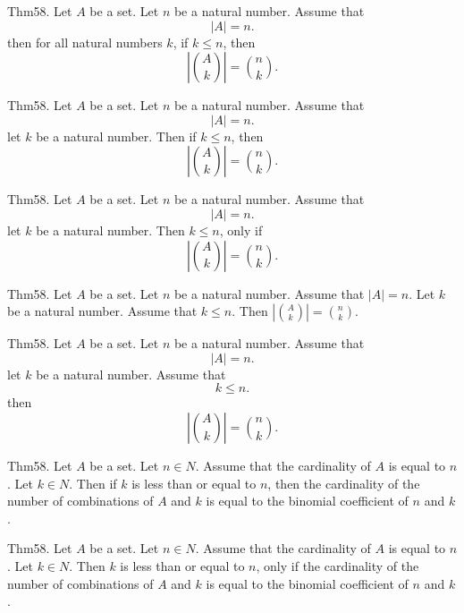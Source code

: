 \documentclass{article}
\begin{document}
Thm58. Let $A$ be a set. Let $n$ be a natural number. Assume that $$| A | = n.$$ then for all natural numbers $k$, if $k \leq n$, then $$| \binom{ A }{ k}| = \binom{ n }{ k}.$$

Thm58. Let $A$ be a set. Let $n$ be a natural number. Assume that $$| A | = n.$$ let $k$ be a natural number. Then if $k \leq n$, then $$| \binom{ A }{ k}| = \binom{ n }{ k}.$$

Thm58. Let $A$ be a set. Let $n$ be a natural number. Assume that $$| A | = n.$$ let $k$ be a natural number. Then $k \leq n$, only if $$| \binom{ A }{ k}| = \binom{ n }{ k}.$$

Thm58. Let $A$ be a set. Let $n$ be a natural number. Assume that $| A | = n$. Let $k$ be a natural number. Assume that $k \leq n$. Then $| \binom{ A }{ k}| = \binom{ n }{ k}$.

Thm58. Let $A$ be a set. Let $n$ be a natural number. Assume that $$| A | = n.$$ let $k$ be a natural number. Assume that $$k \leq n.$$ then $$| \binom{ A }{ k}| = \binom{ n }{ k}.$$

Thm58. Let $A$ be a set. Let $n \in N$. Assume that the cardinality of $A$ is equal to $n$. Let $k \in N$. Then if $k$ is less than or equal to $n$, then the cardinality of the number of combinations of $A$ and $k$ is equal to the binomial coefficient of $n$ and $k$.

Thm58. Let $A$ be a set. Let $n \in N$. Assume that the cardinality of $A$ is equal to $n$. Let $k \in N$. Then $k$ is less than or equal to $n$, only if the cardinality of the number of combinations of $A$ and $k$ is equal to the binomial coefficient of $n$ and $k$.
\end{document}
